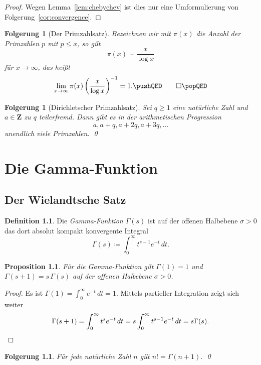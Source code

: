 \documentclass[a4paper,twoside,openright]{report}
\newtheorem{prop}[thm]{Proposition}
\newtheorem{cor}[thm]{Folgerung}
\theoremstyle{definition}
\newtheorem{dfn}[thm]{Definition}
\theoremstyle{remark}
\begin{document}
\begin{proof}
  Wegen Lemma~\ref{lem:chebychev} ist dies nur eine Umformulierung von
  Folgerung~\ref{cor:convergence}.
\end{proof}

\begin{cor}[Der Primzahlsatz]
  Bezeichnen wir mit $\pi(x)$ die Anzahl der Primzahlen $p$ mit $p \leq x$, so
  gilt
  \[
    \pi(x) \sim \frac x {\log x}
  \]
  für $x \to \infty$, das heißt
  \[
    \lim_{x \to \infty} \pi(x) \left(\frac x {\log x}\right)^{-1} = 1.
    \pushQED\qed
    \qedhere
    \popQED
  \]
\end{cor}

\begin{cor}[Dirichletscher Primzahlsatz]
  Sei $q \ge 1$ eine natürliche Zahl und $a \in \mathbf Z$ zu $q$ teilerfremd.
  Dann gibt es in der \emph{arithmetischen Progression}
  \[
    a, a + q, a + 2 q, a + 3 q, \dots
  \]
  unendlich viele Primzahlen.
  \qed
\end{cor}

\chapter{Die Gamma-Funktion}

\section{Der Wielandtsche Satz}

\begin{dfn}
  Die \emph{Gamma-Funktion $\Gamma(s)$} ist auf der offenen Halbebene
  $\sigma > 0$ das dort absolut kompakt konvergente Integral
  \[
    \Gamma(s) \coloneqq \int_0^\infty t^{s - 1} e^{-t} \, dt.
  \]
\end{dfn}

\begin{prop}
  Für die Gamma-Funktion gilt $\Gamma(1) = 1$ und $\Gamma(s + 1) = s \, \Gamma(s)$
  auf der offenen Halbebene $\sigma > 0$.
\end{prop}

\begin{proof}
  Es ist $\Gamma(1) = \int_0^\infty e^{-t} \, dt = 1$. Mittels partieller
  Integration zeigt sich weiter
  \[
    \Gamma(s + 1) = \int_0^\infty t^s e^{-t} \, dt
    = s \int_0^\infty t^{s - 1} e^{-t} \, dt = s \Gamma(s).
    \qedhere
  \]
\end{proof}

\begin{cor}
  Für jede natürliche Zahl $n$ gilt $n! = \Gamma(n + 1)$.
  \qed
\end{cor}
\end{document}
